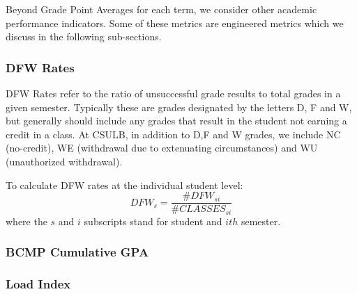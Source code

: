 \documentclass[notitlepage,12pt]{jedm}
\begin{document}
\par Beyond Grade Point Averages for each term, we consider other academic performance indicators. Some of these metrics are engineered metrics which we discuss in the following sub-sections.

\subsubsection{DFW Rates}

\par DFW Rates refer to the ratio of unsuccessful grade results to total grades in a given semester. Typically these are grades designated by the letters D, F and W, but generally should include any grades that result in the student not earning a credit in a class. At CSULB, in addition to D,F and W grades, we include NC (no-credit), WE (withdrawal due to extenuating circumstances) and WU (unauthorized withdrawal).

\par To calculate DFW rates at the individual student level: \[ DFW_s = \frac{ \# DFW_{si} }{ \# CLASSES_{si}  } \] where the $s$ and $i$ subscripts stand for student and $ith$ semester.

\subsubsection{BCMP Cumulative GPA}
\subsubsection{Load Index}
\end{document}

